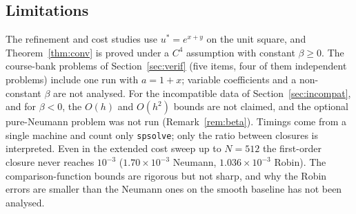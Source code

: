 \documentclass[11pt,a4paper]{article}
\theoremstyle{palplain}
\theoremstyle{paldef}
\theoremstyle{palremark}
\begin{document}
\subsection{Limitations}
The refinement and cost studies use $u^*=e^{x+y}$ on the unit square, and
Theorem~\ref{thm:conv} is proved under a $C^4$ assumption with constant $\beta\ge 0$. The
course-bank problems of Section~\ref{sec:verif} (five items, four of them independent problems)
include one run with $a=1+x$; variable coefficients and a non-constant $\beta$ are not analysed.
For the incompatible data of Section~\ref{sec:incompat}, and for $\beta<0$, the $O(h)$ and
$O(h^2)$ bounds are not claimed, and the optional pure-Neumann problem was not run
(Remark~\ref{rem:beta}). Timings come from a single machine and count only \texttt{spsolve};
only the ratio between closures is interpreted. Even in the extended cost sweep up to $N=512$
the first-order closure never reaches $10^{-3}$ ($1.70\times10^{-3}$ Neumann,
$1.036\times10^{-3}$ Robin). The comparison-function bounds are rigorous but not sharp, and why
the Robin errors are smaller than the Neumann ones on the smooth baseline has not been analysed.

\clearpage
\end{document}
